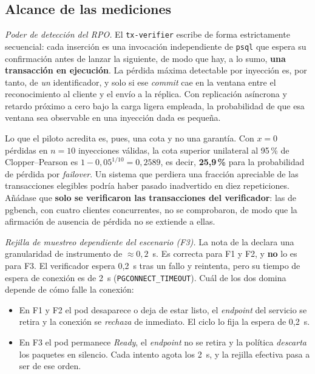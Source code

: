 \subsection{Alcance de las mediciones}
\textit{Poder de detección del RPO.}
El \texttt{tx-verifier} escribe de forma estrictamente secuencial: cada inserción es una invocación
independiente de \texttt{psql} que espera su confirmación antes de lanzar la siguiente, de modo que
hay, a lo sumo, \textbf{una transacción en ejecución}. La pérdida máxima detectable por inyección es, por
tanto, de \emph{un} identificador, y solo si ese \textit{commit} cae en la ventana entre el
reconocimiento al cliente y el envío a la réplica. Con replicación asíncrona y retardo próximo a
cero bajo la carga ligera empleada, la probabilidad de que esa ventana sea observable en una
inyección dada es pequeña.

Lo que el piloto acredita es, pues, una cota y no una garantía. Con $x=0$ pérdidas en $n=10$
inyecciones válidas, la cota superior unilateral al 95\,\% de Clopper--Pearson es
$1-0{,}05^{1/10}=0{,}2589$, es decir, \textbf{25,9\,\%} para la probabilidad de pérdida por
\textit{failover}. Un sistema que perdiera una fracción apreciable de las transacciones elegibles
podría haber pasado inadvertido en diez repeticiones. Añádase que \textbf{solo se verificaron las
transacciones del verificador}: las de pgbench, con cuatro clientes concurrentes, no se
comprobaron, de modo que la afirmación de ausencia de pérdida no se extiende a ellas.

\textit{Rejilla de muestreo dependiente del escenario (F3).}
La nota de la  declara una granularidad de instrumento de $\approx 0{,}2$~s. Es
correcta para F1 y F2, y \textbf{no} lo es para F3. El verificador espera 0,2~s tras un fallo y
reintenta, pero su tiempo de espera de conexión es de 2~s (\texttt{PGCONNECT\_TIMEOUT}). Cuál de
los dos domina depende de cómo falle la conexión:

\begin{itemize}[leftmargin=1.2em,itemsep=2pt,topsep=2pt]
\item En F1 y F2 el pod desaparece o deja de estar listo, el \textit{endpoint} del servicio se
retira y la conexión se \emph{rechaza} de inmediato. El ciclo lo fija la espera de 0,2~s.
\item En F3 el pod permanece \textit{Ready}, el \textit{endpoint} no se retira y la política
\emph{descarta} los paquetes en silencio. Cada intento agota los 2~s, y la rejilla efectiva pasa a
ser de ese orden.
\end{itemize}

